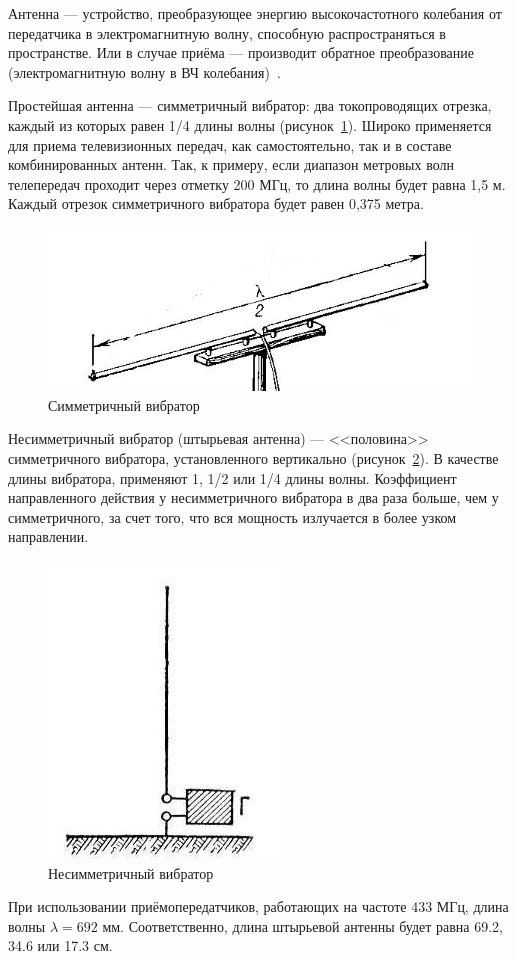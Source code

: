 Антенна --- устройство, преобразующее энергию высокочастотного колебания от передатчика в электромагнитную волну, способную распространяться в пространстве. Или в случае приёма --- производит обратное преобразование (электромагнитную волну в ВЧ колебания)~\cite{habr:antenna}.

Простейшая антенна --- симметричный вибратор: два токопроводящих отрезка, каждый из которых равен 1/4 длины волны (рисунок~\ref{fig:symvibr}). Широко применяется для приема телевизионных передач, как самостоятельно, так и в составе комбинированных антенн. Так, к примеру, если диапазон метровых волн телепередач проходит через отметку 200 МГц, то длина волны будет равна 1,5 м. Каждый отрезок симметричного вибратора будет равен 0,375 метра.

\begin{figure}[ht]
    \includegraphics[width=.6\linewidth]{Figures/symvibr.jpg}
    \caption{Симметричный вибратор}
    \label{fig:symvibr}
\end{figure}

Несимметричный вибратор (штырьевая антенна) --- <<половина>> симметричного вибратора, установленного вертикально (рисунок~\ref{fig:asymvibr}). В качестве длины вибратора, применяют 1, 1/2 или 1/4 длины волны. Коэффициент направленного действия у несимметричного вибратора в два раза больше, чем у симметричного, за счет того, что вся мощность излучается в более узком направлении.

\begin{figure}[ht]
    \includegraphics[width=.2\linewidth]{Figures/asymvibr.jpg}
    \caption{Несимметричный вибратор}
    \label{fig:asymvibr}
\end{figure}

При использовании приёмопередатчиков, работающих на частоте 433 МГц, длина волны $\lambda = 692$ мм. Соответственно, длина штырьевой антенны будет равна 69.2, 34.6 или 17.3 см.

